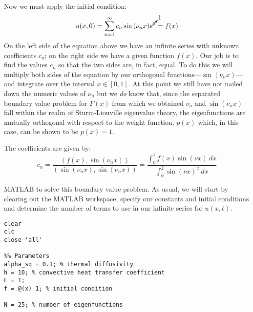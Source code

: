 \noindent Now we must apply the initial condition:
\begin{equation*}
u(x,0) = \sum\limits_{n=1}^{\infty}c_n \sin{(\nu_n x)}\cancelto{1}{e^{0}} = f(x)
\end{equation*}
On the left side of the equation above we have an infinite series with unknown coefficients $c_n$; on the right side we have a given function $f(x)$.  Our job is to find the values $c_n$ so that the two sides are, in fact, equal.  To do this we will multiply both sides of the equation by our orthogonal functions---$\sin{(\nu_n x)}$---and integrate over the interval $x \in [0,1]$.   At this point we still have not nailed down the numeric values of $\nu_n$ but we \emph{do} know that, since the separated boundary value problem for $F(x)$ from which we obtained $\nu_n$ and $\sin{(\nu_n x)}$ fall within the realm of Sturm-Liouville eigenvalue theory, the eigenfunctions are mutually orthogonal with respect to the weight function, $p(x)$ which, in this case, can be shown to be $p(x)=1$. 

The coefficients are given by:
\begin{equation*}
c_n = \frac{\left(f(x),\sin{(\nu_n x)}\right)}{\left( \sin{(\nu_n x)}, \sin{(\nu_n x)}\right)} = \frac{\int_0^1 f(x) \sin{(\nu x)}\ dx}{\int_0^2 \sin{(\nu x)}^2 \ dx}
\end{equation*}

 MATLAB to solve this boundary value problem.  As usual, we will start by clearing out the MATLAB workspace, specify our constants and initial conditions and determine the number of terms to use in our infinite series for $u(x,t)$.

\begin{lstlisting}[name=lec28-ex1, style=myMatlab]
clear
clc
close 'all'

%% Parameters
alpha_sq = 0.1; % thermal diffusivity
h = 10; % convective heat transfer coefficient
L = 1;
f = @(x) 1; % initial condition

N = 25; % number of eigenfunctions


\end{lstlisting}

